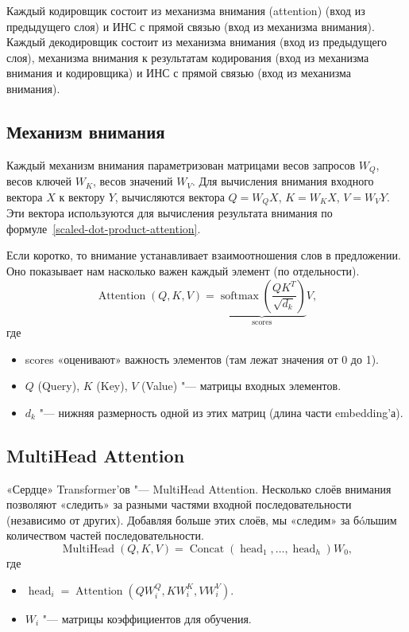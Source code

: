 Каждый кодировщик состоит из механизма внимания (attention) (вход из предыдущего слоя) и ИНС с прямой связью (вход из механизма внимания). Каждый декодировщик состоит из механизма внимания (вход из предыдущего слоя), механизма внимания к результатам кодирования (вход из механизма внимания и кодировщика) и ИНС с прямой связью (вход из механизма внимания).


\subsection{Механизм внимания}


Каждый механизм внимания параметризован матрицами весов запросов $W_{Q}$, весов ключей $W_{K}$, весов значений $W_{V}$. Для вычисления внимания входного вектора $X$ к вектору $Y$, вычисляются вектора $Q=W_{Q}X$, $K=W_{K}X$, $V=W_{V}Y$. Эти вектора используются для вычисления результата внимания по формуле~\eqref{scaled-dot-product-attention}.

Если коротко, то внимание устанавливает взаимоотношения слов в предложении. Оно показывает нам насколько важен каждый элемент (по отдельности).
\begin{equation}\label{scaled-dot-product-attention}%
  \operatorname{Attention}(Q, K, V) = \underbrace{
    \operatorname{softmax}\left(
      \frac{QK^T}{\sqrt{d_k}}
    \right)
  }_{\text{scores}}
  V,
\end{equation}
где
\begin{itemize}%
  \item scores «оценивают» важность элементов (там лежат значения от 0 до 1).
  \item $Q$ (Query), $K$ (Key), $V$ (Value) "--- матрицы входных элементов.
  \item $d_k$ "--- нижняя размерность одной из этих матриц (длина части embedding'а).
\end{itemize}


\subsection{MultiHead Attention}


«Сердце» Transformer'ов "--- MultiHead Attention.
Несколько слоёв внимания позволяют «следить» за разными частями входной последовательности (независимо от других).
Добавляя больше этих слоёв, мы «следим» за бóльшим количеством частей последовательности.
\begin{equation}\label{multihead-attention-mechanism}%
  \operatorname{MultiHead}(Q, K, V) = \operatorname{Concat}\left(\operatorname{head}_1, \ldots, \operatorname{head}_h \right) W_0,
\end{equation}
где
\begin{itemize}%
  \item $\operatorname{head}_i = \operatorname{Attention}(QW_i^Q, KW_i^K, VW_i^V) $.
  \item $W_i$ "--- матрицы коэффициентов для обучения.
\end{itemize}


